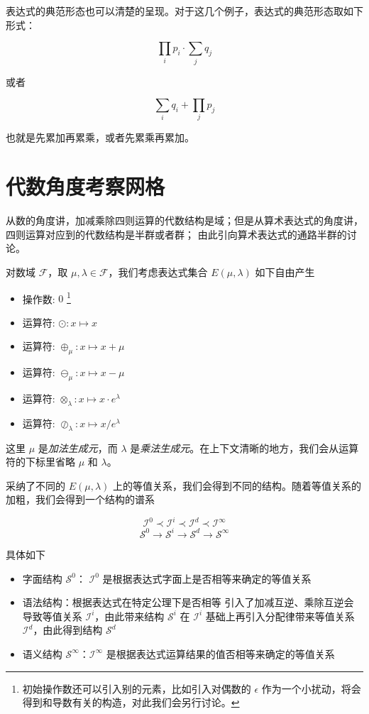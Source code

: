 \documentclass[a4paper,12pt]{article}
\numberwithin{definition}{section}
\numberwithin{lemma}{section}
\numberwithin{proposition}{section}
\numberwithin{theorem}{section}
\numberwithin{grammar}{section}
\numberwithin{program}{section}
\numberwithin{convention}{section}
\numberwithin{corollary}{section}
\begin{document}
表达式的典范形态也可以清楚的呈现。对于这几个例子，表达式的典范形态取如下形式：

$$
\prod_{i} p_i \cdot \sum_{j} q_j
$$

或者

$$
\sum_{i} q_i + \prod_{j} p_j
$$

也就是先累加再累乘，或者先累乘再累加。

\newpage

\section{代数角度考察网格}

从数的角度讲，加减乘除四则运算的代数结构是域；但是从算术表达式的角度讲，四则运算对应到的代数结构是半群或者群；
由此引向算术表达式的通路半群的讨论。

对数域 $\mathcal{F}$，取 $\mu, \lambda \in \mathcal{F}$，我们考虑表达式集合 $E(\mu, \lambda)$ 如下自由产生
\begin{itemize}
    \item 操作数: $0$ \footnote[1]{初始操作数还可以引入别的元素，比如引入对偶数的 $\epsilon$ 作为一个小扰动，将会得到和导数有关的构造，对此我们会另行讨论。}
    \item 运算符: $\odot: x \mapsto x$
    \item 运算符: $\oplus_\mu: x \mapsto x + \mu$
    \item 运算符: $\ominus_\mu: x \mapsto x - \mu$
    \item 运算符: $\otimes_\lambda: x \mapsto x \cdot e^\lambda$
    \item 运算符: $\oslash_\lambda: x \mapsto x / e^\lambda$
\end{itemize}

这里 $\mu$ 是\emph{加法生成元}，而 $\lambda$ 是\emph{乘法生成元}。在上下文清晰的地方，我们会从运算符的下标里省略 $\mu$ 和 $\lambda$。

采纳了不同的 $E(\mu, \lambda)$ 上的等值关系，我们会得到不同的结构。随着等值关系的加粗，我们会得到一个结构的谱系

$$
  \mathcal{I}^0 \prec \mathcal{I}^i \prec \mathcal{I}^d \prec \mathcal{I}^\infty
$$
$$
  \mathcal{S}^0 \to \mathcal{S}^i \to \mathcal{S}^d \to \mathcal{S}^\infty
$$

具体如下

\begin{itemize}
    \item 字面结构 $\mathcal{S}^0$： $\mathcal{I}^0$ 是根据表达式字面上是否相等来确定的等值关系
    \item 语法结构：根据表达式在特定公理下是否相等
        \subitem 引入了加减互逆、乘除互逆会导致等值关系 $\mathcal{I}^i$，由此带来结构 $\mathcal{S}^i$
        \subitem 在 $\mathcal{I}^i$ 基础上再引入分配律带来等值关系 $\mathcal{I}^d$，由此得到结构 $\mathcal{S}^d$
    \item 语义结构 $\mathcal{S}^\infty$：$\mathcal{I}^\infty$ 是根据表达式运算结果的值否相等来确定的等值关系
\end{itemize}
\end{document}
